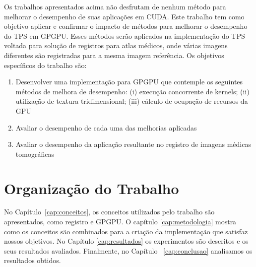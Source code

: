   Os trabalhos apresentados acima não desfrutam de nenhum método para melhorar
o desempenho de suas aplicações em CUDA. Este trabalho tem como objetivo aplicar
e confirmar o impacto de métodos para melhorar o desempenho do TPS em GPGPU.
Esses métodos serão aplicados na implementação do TPS voltada para solução de 
registros para atlas médicos, onde várias imagens diferentes são registradas 
para a mesma imagem referência. Os objetivos específicos do trabalho são:

\begin{enumerate}
  \item Desenvolver uma implementação para GPGPU que contemple os seguintes métodos
        de melhora de desempenho: (i) execução concorrente de kernels; 
        (ii) utilização de textura tridimensional;
        (iii) cálculo de ocupação de recursos da GPU

  \item Avaliar o desempenho de cada uma das melhorias aplicadas
  
  \item Avaliar o desempenho da aplicação resultante no registro de imagens médicas tomográficas
\end{enumerate}

\section{Organização do Trabalho}
\label{sec:organizacao_trabalho}

No Capítulo~\ref{cap:conceitos}, os conceitos utilizados pelo trabalho
são apresentados, como registro e GPGPU. O capítulo \ref{cap:metodologia}
mostra como os conceitos são combinados para a criação da implementação que
satisfaz nossos objetivos. No Capítulo \ref{cap:resultados} os experimentos são
descritos e os seus resultados avaliados. Finalmente, no Capítulo
~\ref{cap:conclusao} analisamos os resultados obtidos.
